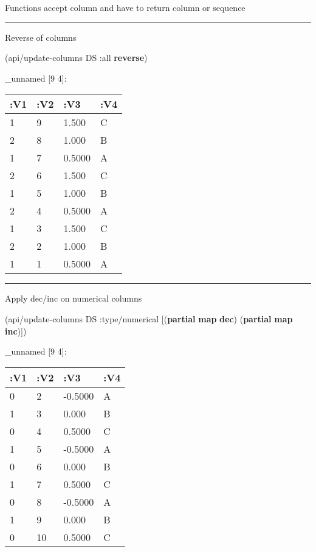 \documentclass[]{article}
\newenvironment{Shaded}{\begin{snugshade}}{\end{snugshade}}
\newcommand{\AttributeTok}[1]{\textcolor[rgb]{0.77,0.63,0.00}{#1}}
\newcommand{\KeywordTok}[1]{\textcolor[rgb]{0.13,0.29,0.53}{\textbf{#1}}}
\newcommand{\NormalTok}[1]{#1}
\begin{document}
Functions accept column and have to return column or sequence

\begin{center}\rule{0.5\linewidth}{0.5pt}\end{center}

Reverse of columns

\begin{Shaded}
\begin{Highlighting}[]
\NormalTok{(api/update-columns DS }\AttributeTok{:all} \KeywordTok{reverse}\NormalTok{) }
\end{Highlighting}
\end{Shaded}

\_unnamed {[}9 4{]}:

\begin{longtable}[]{@{}llll@{}}
\toprule
:V1 & :V2 & :V3 & :V4\tabularnewline
\midrule
\endhead
1 & 9 & 1.500 & C\tabularnewline
2 & 8 & 1.000 & B\tabularnewline
1 & 7 & 0.5000 & A\tabularnewline
2 & 6 & 1.500 & C\tabularnewline
1 & 5 & 1.000 & B\tabularnewline
2 & 4 & 0.5000 & A\tabularnewline
1 & 3 & 1.500 & C\tabularnewline
2 & 2 & 1.000 & B\tabularnewline
1 & 1 & 0.5000 & A\tabularnewline
\bottomrule
\end{longtable}

\begin{center}\rule{0.5\linewidth}{0.5pt}\end{center}

Apply dec/inc on numerical columns

\begin{Shaded}
\begin{Highlighting}[]
\NormalTok{(api/update-columns DS }\AttributeTok{:type/numerical}\NormalTok{ [(}\KeywordTok{partial} \KeywordTok{map} \KeywordTok{dec}\NormalTok{)}
\NormalTok{                                        (}\KeywordTok{partial} \KeywordTok{map} \KeywordTok{inc}\NormalTok{)])}
\end{Highlighting}
\end{Shaded}

\_unnamed {[}9 4{]}:

\begin{longtable}[]{@{}llll@{}}
\toprule
:V1 & :V2 & :V3 & :V4\tabularnewline
\midrule
\endhead
0 & 2 & -0.5000 & A\tabularnewline
1 & 3 & 0.000 & B\tabularnewline
0 & 4 & 0.5000 & C\tabularnewline
1 & 5 & -0.5000 & A\tabularnewline
0 & 6 & 0.000 & B\tabularnewline
1 & 7 & 0.5000 & C\tabularnewline
0 & 8 & -0.5000 & A\tabularnewline
1 & 9 & 0.000 & B\tabularnewline
0 & 10 & 0.5000 & C\tabularnewline
\bottomrule
\end{longtable}
\end{document}
